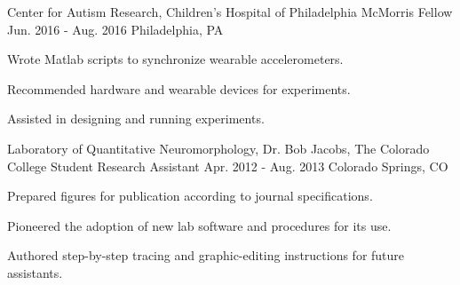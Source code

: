\begin{cventries}
{      %
    }
  \cventry
    {Center for Autism Research, Children’s Hospital of Philadelphia} %
    {McMorris Fellow} %
    {Jun. 2016 - Aug. 2016} %
    {Philadelphia, PA} %
    {
      \begin{cvitems} %
        \item {Wrote Matlab scripts to synchronize wearable accelerometers.}
        \item {Recommended hardware and wearable devices for experiments.}
        \item {Assisted in designing and running experiments.}
      \end{cvitems}
    }
  \cventry
  	{Laboratory of Quantitative Neuromorphology, Dr. Bob Jacobs, The Colorado College} %
    {Student Research Assistant} %
    {Apr. 2012 - Aug. 2013} %
    {Colorado Springs, CO} %
    {
      \begin{cvitems} %
        \item {Prepared figures for publication according to journal specifications.}
        \item {Pioneered the adoption of new lab software and procedures for its use.}
        \item {Authored step-by-step tracing and graphic-editing instructions for future assistants.}
      \end{cvitems}
    }
\end{cventries}


